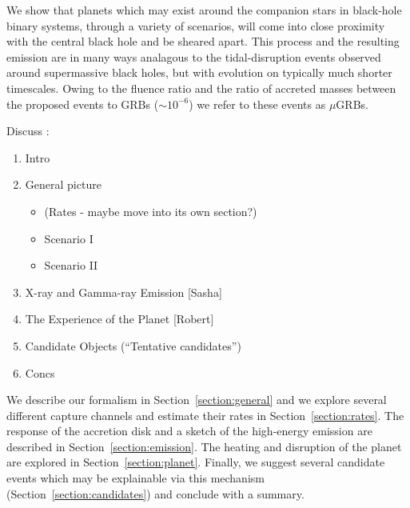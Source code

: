 We show that planets which may exist around the companion stars in
black-hole binary systems, through a variety of scenarios, will come
into close proximity with the central black hole and be sheared apart.
This process and the resulting emission are in many ways analagous to
the tidal-disruption events observed around supermassive black holes,
but with evolution on typically much shorter timescales.  Owing to the
fluence ratio and the ratio of accreted masses between the proposed
events to GRBs ($\sim 10^{-6}$) we refer to these events as $\mu$GRBs.


Discuss : 
\begin{enumerate}
\item  Intro  
\item  General picture  
\begin{itemize}
\item (Rates - maybe move into its own section?) 
\item  Scenario I   
\item  Scenario II  
\end{itemize}
\item  X-ray and Gamma-ray Emission [Sasha] 
\item  The Experience of the Planet [Robert] 
\item  Candidate Objects (``Tentative candidates'') 
\item  Concs  
\end{enumerate}


We describe our formalism in Section~\ref{section:general} and we
explore several different capture channels and estimate their rates in
Section~\ref{section:rates}.  The response of the accretion disk and a
sketch of the high-energy emission are described in
Section~\ref{section:emission}.  The heating and disruption of the
planet are explored in Section~\ref{section:planet}.  Finally, we
suggest several candidate events which may be explainable via this
mechanism (Section~\ref{section:candidates}) and conclude with a
summary.

